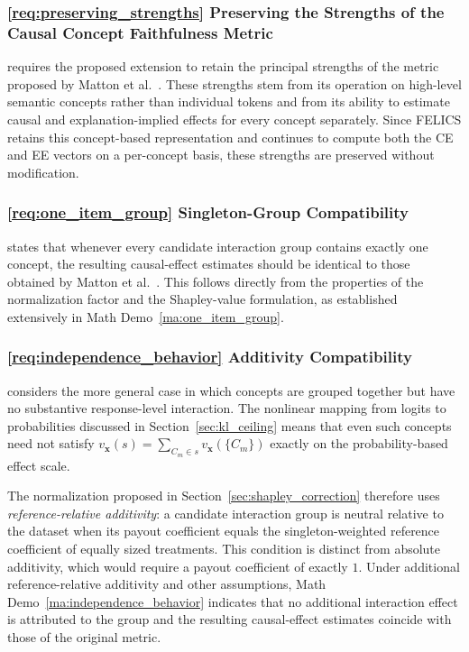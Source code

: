 \subsubsection{\ref{req:preserving_strengths} Preserving the Strengths of the Causal Concept Faithfulness Metric}

 requires the proposed extension to retain the principal strengths of the metric proposed by Matton et al.~\cite{mattonWalkTalkMeasuring2024}. These strengths stem from its operation on high-level semantic concepts rather than individual tokens and from its ability to estimate causal and explanation-implied effects for every concept separately. Since FELICS retains this concept-based representation and continues to compute both the CE and EE vectors on a per-concept basis, these strengths are preserved without modification.

\subsubsection{\ref{req:one_item_group} Singleton-Group Compatibility}

 states that whenever every candidate interaction group contains exactly one concept, the resulting causal-effect estimates should be identical to those obtained by Matton et al.~\cite{mattonWalkTalkMeasuring2024}. This follows directly from the properties of the normalization factor and the Shapley-value formulation, as established extensively in Math Demo~\ref{ma:one_item_group}.

\subsubsection{\ref{req:independence_behavior} Additivity Compatibility}

 considers the more general case in which concepts are grouped together but have no substantive response-level interaction. The nonlinear mapping from logits to probabilities discussed in Section~\ref{sec:kl_ceiling} means that even such concepts need not satisfy $v_{\mathbf{x}}(s)=\sum_{C_m\in s}v_{\mathbf{x}}(\{C_m\})$ exactly on the probability-based effect scale.

The normalization proposed in Section~\ref{sec:shapley_correction} therefore uses \emph{reference-relative additivity}: a candidate interaction group is neutral relative to the dataset when its payout coefficient equals the singleton-weighted reference coefficient of equally sized treatments. This condition is distinct from absolute additivity, which would require a payout coefficient of exactly $1$. Under additional reference-relative additivity and other assumptions, Math Demo~\ref{ma:independence_behavior} indicates that no additional interaction effect is attributed to the group and the resulting causal-effect estimates coincide with those of the original metric.


